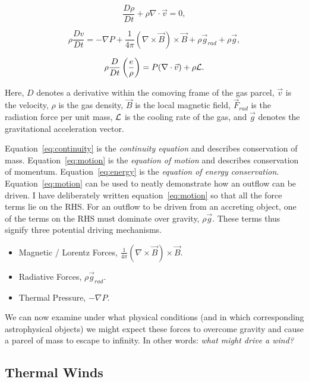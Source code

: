 \begin{equation}
\label{eq:continuity}
\frac{D \rho}{Dt} + \rho \nabla \cdot \vec{v} = 0,
\end{equation}

\begin{equation}
\label{eq:motion}
\rho \frac{Dv}{Dt} = -\nabla P + \frac{1}{4 \pi}(\nabla \times \vec{B}) \times \vec{B} + \rho \vec{g}_{rad} + \rho \vec{g},
\end{equation}

\begin{equation}
\label{eq:energy}
\rho \frac{D}{Dt} \left(\frac{e}{\rho}\right) = P (\nabla \cdot \vec{v}) + \rho \cal{L}.
\end{equation}

Here, $D$ denotes a derivative within the comoving frame of the gas parcel, $\vec{v}$ is the velocity,
$\rho$ is the gas density, $\vec{B}$ is the local magnetic field, 
$\vec{F}_{rad}$ is the radiation
force per unit mass, $\cal{L}$ is the cooling rate of the gas, 
and $\vec{g}$ denotes the gravitational acceleration vector.

Equation~\ref{eq:continuity} is the {\em continuity equation} and describes conservation of mass. 
Equation~\ref{eq:motion} is the {\em equation of motion} and describes conservation of momentum.
Equation~\ref{eq:energy} is the {\em equation of energy conservation}. 
Equation~\ref{eq:motion} can be used to neatly demonstrate how an outflow can be driven. I have 
deliberately written equation~\ref{eq:motion} 
so that all the force terms lie on the RHS. 
For an outflow to be driven from an accreting object, one of the terms on the RHS must
dominate over gravity, $\rho \vec{g}$. These terms thus signify three potential
driving mechanisms.

\begin{itemize}
	\item Magnetic / Lorentz Forces, $\frac{1}{4 \pi}(\nabla \times \vec{B}) \times \vec{B}$.
	\item Radiative Forces, $\rho \vec{g}_{rad}$.
	\item Thermal Pressure, $-\nabla P$.
\end{itemize}

We can now examine under what physical conditions 
(and in which corresponding astrophysical objects)
we might expect these forces to overcome gravity and 
cause a parcel of mass to escape to infinity.
In other words: {\em what might drive a wind?}

\subsection{Thermal Winds}

